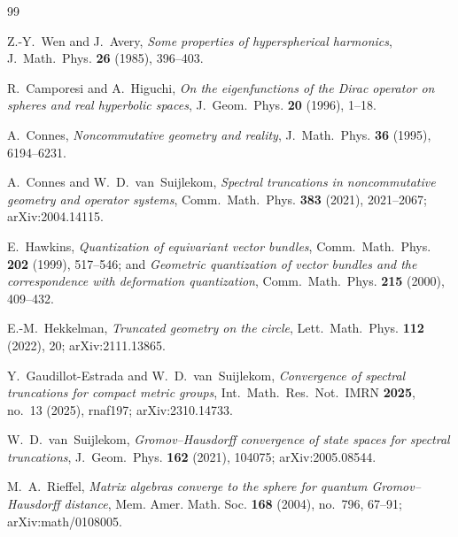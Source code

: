\documentclass[11pt,a4paper]{article}
\theoremstyle{plain}
\theoremstyle{definition}
\begin{document}

\begin{thebibliography}{99}

Z.-Y.~Wen and J.~Avery,
\newblock \emph{Some properties of hyperspherical harmonics},
\newblock J.~Math.~Phys. \textbf{26} (1985), 396--403.

R.~Camporesi and A.~Higuchi,
\newblock \emph{On the eigenfunctions of the Dirac operator on
spheres and real hyperbolic spaces},
\newblock J.~Geom.~Phys. \textbf{20} (1996), 1--18.

A.~Connes,
\newblock \emph{Noncommutative geometry and reality},
\newblock J.~Math.~Phys. \textbf{36} (1995), 6194--6231.

A.~Connes and W.~D.~van~Suijlekom,
\newblock \emph{Spectral truncations in noncommutative geometry and
operator systems},
\newblock Comm.~Math.~Phys. \textbf{383} (2021), 2021--2067;
\newblock arXiv:2004.14115.

E.~Hawkins,
\newblock \emph{Quantization of equivariant vector bundles},
\newblock Comm.~Math.~Phys. \textbf{202} (1999), 517--546;
\newblock and \emph{Geometric quantization of vector bundles and the
correspondence with deformation quantization},
\newblock Comm.~Math.~Phys. \textbf{215} (2000), 409--432.

E.-M.~Hekkelman,
\newblock \emph{Truncated geometry on the circle},
\newblock Lett.~Math.~Phys. \textbf{112} (2022), 20;
\newblock arXiv:2111.13865.

Y.~Gaudillot-Estrada and W.~D.~van~Suijlekom,
\newblock \emph{Convergence of spectral truncations for compact
metric groups},
\newblock Int.~Math.~Res.~Not.\ IMRN \textbf{2025}, no.~13 (2025),
rnaf197;
\newblock arXiv:2310.14733.

W.~D.~van~Suijlekom,
\newblock \emph{Gromov--Hausdorff convergence of state spaces for
spectral truncations},
\newblock J.~Geom.~Phys. \textbf{162} (2021), 104075;
\newblock arXiv:2005.08544.

M.~A.~Rieffel,
\newblock \emph{Matrix algebras converge to the sphere for quantum
Gromov--Hausdorff distance},
\newblock Mem. Amer. Math. Soc. \textbf{168} (2004), no.~796, 67--91;
arXiv:math/0108005.


\end{thebibliography}
\end{document}

